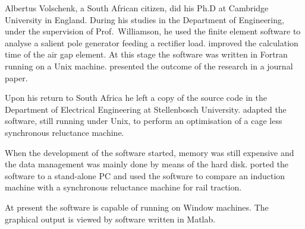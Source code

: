 Albertus Volschenk, a South African citizen, did his Ph.D at Cambridge University in England. During 
his studies in the Department of Engineering, under the supervision of Prof.~Williamson, he used the 
finite element software to analyse a salient pole generator feeding a rectifier load. 
\cite{Volschenk1993} improved the calculation time of the air gap element. At this stage the software 
was written in Fortran running on a Unix machine. \cite{Williamson1995} presented the outcome of the 
research in a journal paper.

Upon his return to South Africa he left a copy of the source code in the Department of Electrical 
Engineering at Stellenbosch University. \cite{Kamper1996} adapted the software, still running under 
Unix, to perform an optimisation of a cage less synchronous reluctance machine. 

When the development of the software started, memory was still expensive and the data management was 
mainly done by means of the hard disk. \cite{Germishuizen2000} ported the software to a stand-alone 
PC and used the software to compare an induction machine with a synchronous reluctance machine for 
rail traction.

At present the software is capable of running on Window machines. The graphical output is viewed by 
software written in Matlab. 

\endinput